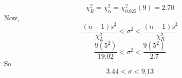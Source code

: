 \documentclass{beamer}
\begin{document}
\begin{frame}
\begin{equation}
    \chi_{R}^2=\chi_{\alpha}^2=\chi_{0.025}^2(9)=2.70
\end{equation}
Now,
\begin{equation}
    \frac{(n-1)s^2}{\chi_{L}^2} < \sigma^2 < \frac{(n-1)s^2}{\chi_{R}^2}
\end{equation}
\begin{equation}
    \frac{9(5^2)}{19.02} < \sigma^2 < \frac{9(5^2)}{2.7}
\end{equation}
So
\begin{equation}
     3.44 < \sigma < 9.13
\end{equation}

\end{frame}
\end{document}
